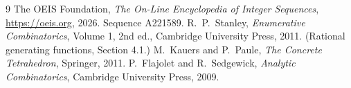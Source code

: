 \documentclass[11pt,a4paper]{article}
\theoremstyle{plain}
\theoremstyle{definition}
\begin{document}
\begin{thebibliography}{9}
 The OEIS Foundation, \emph{The On-Line Encyclopedia of Integer
Sequences}, \url{https://oeis.org}, 2026. Sequence A221589.
 R.~P.~Stanley, \emph{Enumerative Combinatorics}, Volume 1, 2nd ed.,
Cambridge University Press, 2011. (Rational generating functions, Section 4.1.)
 M.~Kauers and P.~Paule, \emph{The Concrete Tetrahedron}, Springer, 2011.
 P.~Flajolet and R.~Sedgewick, \emph{Analytic Combinatorics}, Cambridge
University Press, 2009.
\end{thebibliography}
\end{document}
